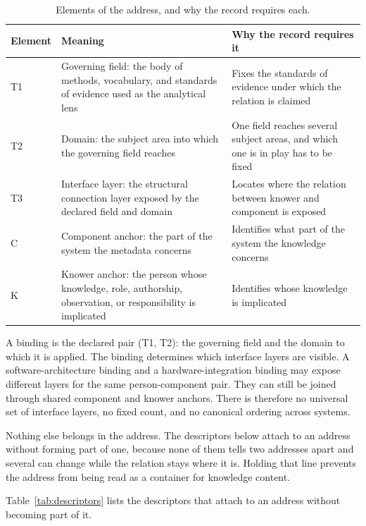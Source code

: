 \documentclass[conference]{IEEEtran}
\begin{document}
\begin{table}[!tb]
\caption{Elements of the address, and why the record requires each.}
\label{tab:address}
\centering
\scriptsize
\begin{tabularx}{\textwidth}{W{0.4}W{1.45}W{1.15}}
\hline
\textbf{Element} & \textbf{Meaning} & \textbf{Why the record requires it} \\
\hline
T1 & Governing field: the body of methods, vocabulary, and standards of evidence used as the analytical lens & Fixes the standards of evidence under which the relation is claimed \\
T2 & Domain: the subject area into which the governing field reaches & One field reaches several subject areas, and which one is in play has to be fixed \\
T3 & Interface layer: the structural connection layer exposed by the declared field and domain & Locates where the relation between knower and component is exposed \\
C & Component anchor: the part of the system the metadata concerns & Identifies what part of the system the knowledge concerns \\
K & Knower anchor: the person whose knowledge, role, authorship, observation, or responsibility is implicated & Identifies whose knowledge is implicated \\
\hline
\end{tabularx}
\end{table}

A binding is the declared pair (T1, T2): the governing field and the domain to which it is applied. The binding determines which interface layers are visible. A software-architecture binding and a hardware-integration binding may expose different layers for the same person-component pair. They can still be joined through shared component and knower anchors. There is therefore no universal set of interface layers, no fixed count, and no canonical ordering across systems.

Nothing else belongs in the address. The descriptors below attach to an address without forming part of one, because none of them tells two addresses apart and several can change while the relation stays where it is. Holding that line prevents the address from being read as a container for knowledge content.

Table~\ref{tab:descriptors} lists the descriptors that attach to an address without becoming part of it.
\end{document}
